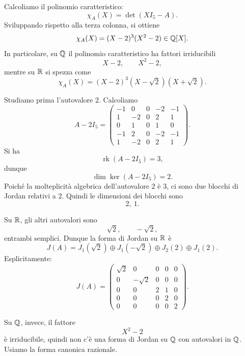 \documentclass[a4paper]{article}
\begin{document}
\begin{radioactive}
\begin{snippetsolution}{}
    Calcoliamo il polinomio caratteristico:
    \[
        \chi_A(X)=\det(XI_5-A).
    \]
    Sviluppando rispetto alla terza colonna, si ottiene
    \[
        \chi_A(X)=(X-2)^3(X^2-2)\in \mathbb{Q}[X].
    \]
    In particolare, su \(\mathbb{Q}\) il polinomio caratteristico ha fattori irriducibili
    \[
        X-2,
        \qquad
        X^2-2,
    \]
    mentre su \(\mathbb{R}\) si spezza come
    \[
        \chi_A(X)=(X-2)^3(X-\sqrt{2})(X+\sqrt{2}).
    \]

    Studiamo prima l'autovalore \(2\). Calcoliamo
    \[
        A-2I_5=
        \begin{pmatrix}
            -1 & 0 & 0 & -2 & -1\\
            1 & -2 & 0 & 2 & 1\\
            0 & 1 & 0 & 1 & 0\\
            -1 & 2 & 0 & -2 & -1\\
            1 & -2 & 0 & 2 & 1
        \end{pmatrix}.
    \]
    Si ha
    \[
        \operatorname{rk}(A-2I_5)=3,
    \]
    dunque
    \[
        \dim\ker(A-2I_5)=2.
    \]
    Poiché la molteplicità algebrica dell'autovalore \(2\) è \(3\), ci sono due blocchi di Jordan relativi a \(2\). Quindi le dimensioni dei blocchi sono
    \[
        2,\ 1.
    \]

    Su \(\mathbb{R}\), gli altri autovalori sono
    \[
        \sqrt{2},
        \qquad
        -\sqrt{2},
    \]
    entrambi semplici. Dunque la forma di Jordan su \(\mathbb{R}\) è
    \[
        J(A)
        =
        J_1(\sqrt{2})
        \oplus
        J_1(-\sqrt{2})
        \oplus
        J_2(2)
        \oplus
        J_1(2).
    \]
    Esplicitamente:
    \[
        J(A)=
        \begin{pmatrix}
            \sqrt{2} & 0 & 0 & 0 & 0\\
            0 & -\sqrt{2} & 0 & 0 & 0\\
            0 & 0 & 2 & 1 & 0\\
            0 & 0 & 0 & 2 & 0\\
            0 & 0 & 0 & 0 & 2
        \end{pmatrix}.
    \]

    Su \(\mathbb{Q}\), invece, il fattore
    \[
        X^2-2
    \]
    è irriducibile, quindi non c'è una forma di Jordan su \(\mathbb{Q}\) con autovalori in \(\mathbb{Q}\). Usiamo la forma canonica razionale.


\end{snippetsolution}
\end{radioactive}
\end{document}
